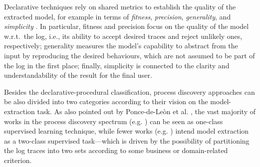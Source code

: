 Declarative techniques rely on shared metrics to establish the quality of the extracted model, for example in terms of \emph{fitness}, \emph{precision}, \emph{generality}, and \emph{simplicity} \cite{2015-Adriansyah,2014-Broucke,2018-Ponce}. In particular, fitness and precision focus on the quality of the model w.r.t.~the log, i.e., its ability to accept desired traces and reject unlikely ones, respectively; generality measures the model's capability to abstract from the input by reproducing the desired behaviours, which are not assumed to be part of the log in the first place; finally, simplicity is connected to the clarity and understandability of the result for the final user. 

Besides the declarative-procedural classification, process discovery approaches can be also divided into two categories according to their vision on the model-extraction task. 
As also pointed out by Ponce-de-Le\`on et al. \cite{2018-Ponce}, the vast majority of works in the process discovery spectrum (e.g. \cite{2004-Aalst,2003-Weijters,2007-Gunther,2010-Aalst}) can be seen as one-class supervised learning technique, while fewer works (e.g. \cite{2006-Maruster,2009-Goedertier,2009-Chesani,slaats_weighing_2021}) intend model extraction as a two-class supervised task---which is driven by the possibility of partitioning the log traces into two sets according to some business or domain-related criterion. %
%
